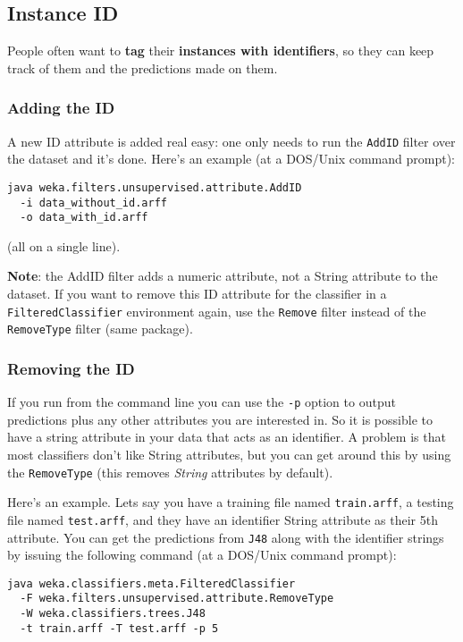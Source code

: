 \subsection{Instance ID}
People often want to \textbf{tag} their \textbf{instances with
  identifiers}, so they can keep track of them and the predictions
made on them.

\subsubsection{Adding the ID}
A new ID attribute is added real easy: one only needs to run the \verb=AddID=
filter over the dataset and it's done. Here's an example (at a
DOS/Unix command prompt):\\

\begin{verbatim}
java weka.filters.unsupervised.attribute.AddID
  -i data_without_id.arff
  -o data_with_id.arff
\end{verbatim}

\noindent (all on a single line).

\textbf{Note}: the AddID filter adds a numeric attribute, not a String
attribute to the dataset. If you want to remove this ID attribute for
the classifier in a \verb=FilteredClassifier= environment again, use the
\verb=Remove= filter instead of the \verb=RemoveType= filter (same package).

\subsubsection{Removing the ID}
If you run from the command line you can use the \verb=-p= option to output
predictions plus any other attributes you are interested in. So it is
possible to have a string attribute in your data that acts as an
identifier. A problem is that most classifiers don't like String
attributes, but you can get around this by using the \verb=RemoveType= (this
removes \textit{String} attributes by default).

Here's an example. Lets say you have a training file named \verb=train.arff=,
a testing file named \verb=test.arff=, and they have an identifier String
attribute as their 5th attribute. You can get the predictions from \verb=J48=
along with the identifier strings by issuing the following command (at
a DOS/Unix command prompt):

\begin{verbatim}
java weka.classifiers.meta.FilteredClassifier
  -F weka.filters.unsupervised.attribute.RemoveType
  -W weka.classifiers.trees.J48
  -t train.arff -T test.arff -p 5
\end{verbatim}

